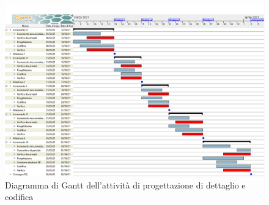 \begin{landscape}

\begin{figure}[h]
 	\centering
	\includegraphics[width=\linewidth]{Images/GanttPianificazioneProgettazioneDettaglioCodifica.png}
	\caption{Diagramma di Gantt dell'attività di progettazione di dettaglio e codifica}
\end{figure}

\end{landscape}
